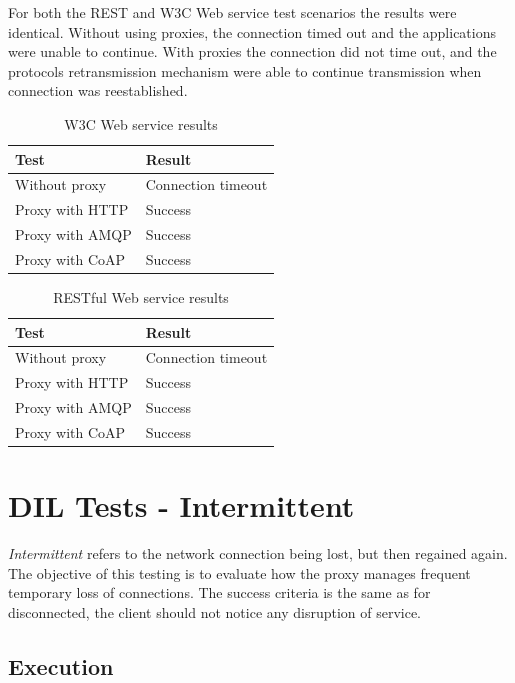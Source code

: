 For both the REST and W3C Web service test scenarios the results were identical.
Without using proxies, the connection timed out and the applications were unable
to continue. With proxies the connection did not time out, and the protocols
retransmission mechanism were able to continue transmission when connection was
reestablished.

\begin{table}[h!]
\begin{tabular}{| l | l |}
\hline
  \textbf{Test} & \textbf{Result} \\ \hline
  Without proxy & Connection timeout \\ \hline
  Proxy with HTTP & Success \\ \hline
  Proxy with AMQP & Success \\ \hline
  Proxy with CoAP & Success \\ \hline
\end{tabular}
\caption{W3C Web service results}
\end{table}

\begin{table}[h!]
\begin{tabular}{| l | l |}
\hline
  \textbf{Test} & \textbf{Result} \\ \hline
  Without proxy & Connection timeout \\ \hline
  Proxy with HTTP & Success \\ \hline
  Proxy with AMQP & Success \\ \hline
  Proxy with CoAP & Success \\ \hline
\end{tabular}
\caption{RESTful Web service results}
\end{table}



\section{DIL Tests - Intermittent}

\textit{Intermittent} refers to the network connection being lost, but then
regained again. The objective of this testing is to evaluate how the proxy
manages frequent temporary loss of connections. The success criteria is the same
as for disconnected, the client should not notice any disruption of service.

\subsection{Execution}

